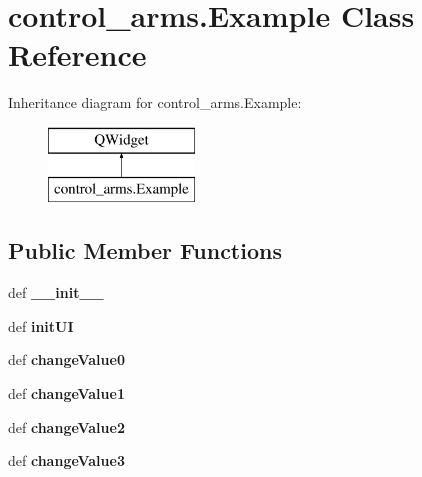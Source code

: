 \hypertarget{classcontrol__arms_1_1Example}{\section{control\-\_\-arms.\-Example Class Reference}
\label{classcontrol__arms_1_1Example}
}
Inheritance diagram for control\-\_\-arms.\-Example\-:\begin{figure}[H]
\begin{center}
\leavevmode
\includegraphics[height=2.000000cm]{classcontrol__arms_1_1Example}
\end{center}
\end{figure}
\subsection*{Public Member Functions}
\begin{DoxyCompactItemize}
\item 
\hypertarget{classcontrol__arms_1_1Example_ad58d2749ddc76efd2f31759852d0befe}{def {\bfseries \-\_\-\-\_\-init\-\_\-\-\_\-}}\label{classcontrol__arms_1_1Example_ad58d2749ddc76efd2f31759852d0befe}

\item 
\hypertarget{classcontrol__arms_1_1Example_a0630b59cab4a2b355b9936ce6163543e}{def {\bfseries init\-U\-I}}\label{classcontrol__arms_1_1Example_a0630b59cab4a2b355b9936ce6163543e}

\item 
\hypertarget{classcontrol__arms_1_1Example_a1564ef7b522ba9664ec7453556092d9c}{def {\bfseries change\-Value0}}\label{classcontrol__arms_1_1Example_a1564ef7b522ba9664ec7453556092d9c}

\item 
\hypertarget{classcontrol__arms_1_1Example_a27a30fa7b4ad54d273d981747d7b4f3a}{def {\bfseries change\-Value1}}\label{classcontrol__arms_1_1Example_a27a30fa7b4ad54d273d981747d7b4f3a}

\item 
\hypertarget{classcontrol__arms_1_1Example_ada953ae89ce86e69f09fbffdecf26933}{def {\bfseries change\-Value2}}\label{classcontrol__arms_1_1Example_ada953ae89ce86e69f09fbffdecf26933}

\item 
\hypertarget{classcontrol__arms_1_1Example_a425878b416e27418671ca20df44638cf}{def {\bfseries change\-Value3}}\label{classcontrol__arms_1_1Example_a425878b416e27418671ca20df44638cf}

\end{DoxyCompactItemize}
